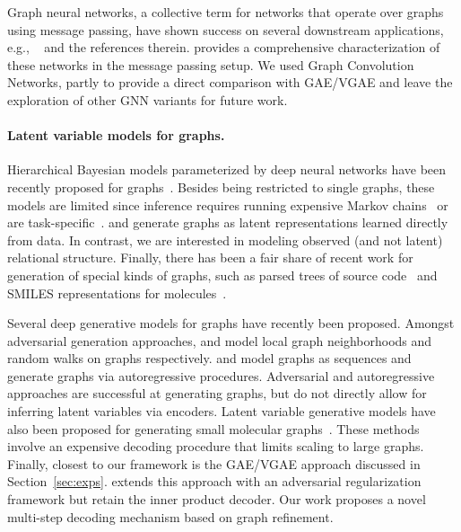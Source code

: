 \documentclass{article}
\begin{document}
Graph neural networks, a collective term for networks that operate over graphs using message passing, have shown success on several downstream applications, e.g., ~\citep{duvenaud2015molecular,li2015gated,kearnes2016molecular,kipf2016semi,hamilton2017inductive} and the references therein. \citet{gilmer2017neural} provides a comprehensive characterization of these networks in the message passing setup. We used Graph Convolution Networks, partly to provide a direct comparison with GAE/VGAE and leave the exploration of other GNN variants for future work.

\paragraph{Latent variable models for graphs.} Hierarchical Bayesian models parameterized by deep neural networks have been recently proposed for graphs~\citep{hu2017deep,wang2017relational}. Besides being restricted to single graphs, these models are limited since inference requires running expensive Markov chains~\citep{hu2017deep} or are task-specific~\citep{wang2017relational}. \citet{johnson2017transitions} and \citet{kipf2018neural} generate graphs as latent representations learned directly from data. In contrast, we are interested in modeling observed (and not latent) relational structure. Finally, there has been a fair share of recent work for generation of special kinds of graphs, such as parsed trees of source code~\citep{maddison2014structured} and SMILES representations  for molecules~\citep{olivecrona2017denovo}. 

 Several deep generative models for graphs have recently been proposed. Amongst adversarial generation approaches, \citet{wang2017graphgan} and \citet{bojchevski2018netgan} model local graph neighborhoods and random walks on graphs respectively. \citet{li2018learning} and \citet{you2018graphrnn} model graphs as sequences and generate graphs via autoregressive procedures. Adversarial and autoregressive approaches are successful at generating graphs, but do not directly allow for inferring latent variables via encoders. Latent variable generative models have also been proposed for generating small molecular graphs~\citep{jin2018junction,samanta2018designing,simonovsky2018graphvae}. These methods involve an expensive decoding procedure that limits scaling to large graphs. Finally, closest to our framework is the GAE/VGAE approach \citep{kipf2016variational} discussed in Section~\ref{sec:exps}. \citet{pan2018adversarially} extends this approach with an adversarial regularization framework but retain the inner product decoder. Our work proposes a novel multi-step decoding mechanism based on graph refinement.
 
\end{document}
